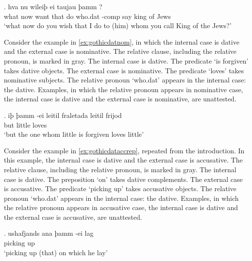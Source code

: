 \exg. hva nu wileiþ ei taujau þamm    ?\\
 what now want that do\scsub{[dat]} who.\ac{dat} -\ac{comp} say\scsub{[acc]} king {of Jews}\\
 `what now do you wish that I do to (him) whom you call King of the Jews?' \label{ex:gothicdataccrep}

Consider the example in \ref{ex:gothicdatnom}, in which the internal case is dative and the external case is nominative.
The relative clause, including the relative pronoun, is marked in gray.
The internal case is dative. The predicate  `is forgiven' takes dative objects.
The external case is nominative. The predicate  `loves' takes nominative subjects.
The relative pronoun  `who.\ac{dat}' appears in the internal case: the dative.
Examples, in which the relative pronoun appears in nominative case, the internal case is dative and the external case is nominative, are unattested.

\exg. iþ þamm -ei leitil fraletada leitil frijod\\
 but     little loves\scsub{[nom]}\\
 `but the one whom little is forgiven loves little' \label{ex:gothicdatnom}

Consider the example in \ref{ex:gothicdataccrep}, repeated from the introduction. In this example, the internal case is dative and the external case is accusative.
The relative clause, including the relative pronoun, is marked in gray.
The internal case is dative. The preposition  `on' takes dative complements.
The external case is accusative. The predicate  `picking up' takes accusative objects.
The relative pronoun  `who.\ac{dat}' appears in the internal case: the dative.
Examples, in which the relative pronoun appears in accusative case, the internal case is dative and the external case is accusative, are unattested.

\exg. ushafjands ana þamm -ei lag\\
 {picking up}\scsub{[acc]}    \\
 `picking up (that) on which he lay' \label{ex:gothicaccdatrep}

